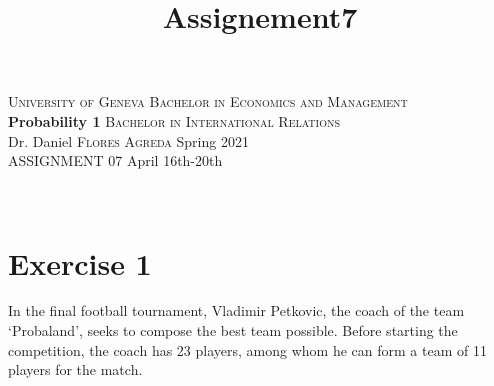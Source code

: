 \documentclass[12pt,thmsa]{article}\usepackage[]{graphicx}\usepackage[]{color}
\title{Assignement7}
\begin{document}
\noindent \textsc{University of Geneva}     \hfill \textsc{Bachelor in Economics and Management} \\
\textbf{Probability 1}                      \hfill \textsc{Bachelor in International Relations} \\
Dr. Daniel \textsc{Flores Agreda}                 \hfill Spring 2021  \\
ASSIGNMENT 07                               \hfill   April 16th-20th



\noindent
\makebox[\linewidth]{\rule{\textwidth}{0.4pt}}\\[1.5ex]


\section*{Exercise 1}

In the final football tournament, Vladimir Petkovic, the coach of the team `Probaland', seeks to compose the best team possible. Before starting the competition, the coach has 23 players, among whom he can form a team of 11 players for the match.
\medskip
\end{document}
